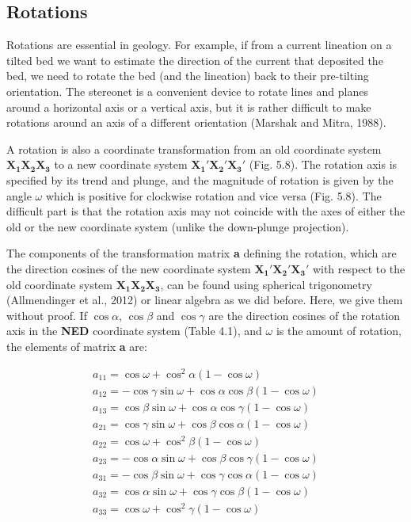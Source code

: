 \documentclass[a4paper , 12pt]{book}
\begin{document}
\subsection{Rotations}

Rotations are essential in geology. For example, if from a current lineation on a tilted bed we want to estimate the direction of the current that deposited the bed, we need to rotate the bed (and the lineation) back to their pre-tilting orientation. The stereonet is a convenient device to rotate lines and planes around a horizontal axis or a vertical axis, but it is rather difficult to make rotations around an axis of a different orientation (Marshak and Mitra, 1988). 

A rotation is also a coordinate transformation from an old coordinate system $\mathbf{X_1}\mathbf{X_2}\mathbf{X_3}$ to a new coordinate system $\mathbf{X_1\text{$'$}}\mathbf{X_2\text{$'$}}\mathbf{X_3\text{$'$}}$ (Fig. 5.8). The rotation axis is specified by its trend and plunge, and the magnitude of rotation is given by the angle $\omega$ which is positive for clockwise rotation and vice versa (Fig. 5.8). The difficult part is that the rotation axis may not coincide with the axes of either the old or the new coordinate system (unlike the down-plunge projection).

The components of the transformation matrix \textbf{a} defining the rotation, which are the direction cosines of the new coordinate system $\mathbf{X_1\text{$'$}}\mathbf{X_2\text{$'$}}\mathbf{X_3\text{$'$}}$ with respect to the old coordinate system $\mathbf{X_1}\mathbf{X_2}\mathbf{X_3}$, can be found using spherical trigonometry (Allmendinger et al., 2012) or linear algebra as we did before. Here, we give them without proof. If $\cos\alpha$, $\cos\beta$ and $\cos\gamma$ are the direction cosines of the rotation axis in the \textbf{NED} coordinate system (Table 4.1), and $\omega$ is the amount of rotation, the elements of matrix \textbf{a} are:

\begin{equation}
    \begin{gathered}
        a_{11}=\cos\omega+\cos^2\alpha(1-\cos\omega) \\
        a_{12}=-\cos\gamma\sin\omega+\cos\alpha\cos\beta(1-\cos\omega) \\
        a_{13}=\cos\beta\sin\omega+\cos\alpha\cos\gamma(1-\cos\omega) \\
        a_{21}=\cos\gamma\sin\omega+\cos\beta\cos\alpha(1-\cos\omega) \\
        a_{22}=\cos\omega+\cos^2\beta(1-\cos\omega) \\
        a_{23}=-\cos\alpha\sin\omega+\cos\beta\cos\gamma(1-\cos\omega) \\
        a_{31}=-\cos\beta\sin\omega+\cos\gamma\cos\alpha(1-\cos\omega) \\
        a_{32}=\cos\alpha\sin\omega+\cos\gamma\cos\beta(1-\cos\omega) \\
        a_{33}=\cos\omega+\cos^2\gamma(1-\cos\omega)
    \end{gathered}
\end{equation}
\end{document}
